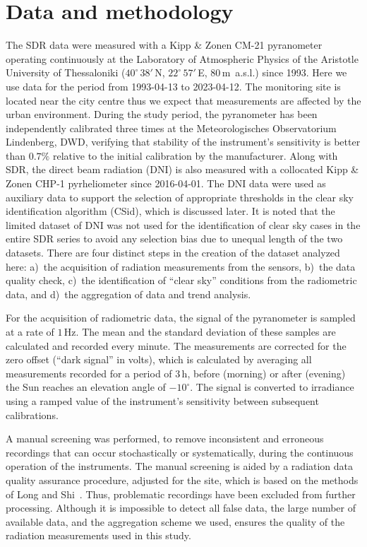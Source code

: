 \documentclass[applsci,article,submit,moreauthors,pdftex]{Definitions/mdpi}
\begin{document}
\hypertarget{data-and-methodology}{%
\section{Data and methodology}\label{data-and-methodology}}

The SDR data were measured with a Kipp \& Zonen CM-21 pyranometer
operating continuously at the Laboratory of Atmospheric Physics of the
Aristotle University of Thessaloniki (\(40^\circ\,38'\,\)N,
\(22^\circ\,57'\,\)E, \(80\,\)m~a.s.l.) since 1993. Here we use data for
the period from 1993-04-13 to 2023-04-12. The monitoring site is located
near the city centre thus we expect that measurements are affected by
the urban environment. During the study period, the pyranometer has been
independently calibrated three times at the Meteorologisches
Observatorium Lindenberg, DWD, verifying that stability of the
instrument's sensitivity is better than \(0.7\%\) relative to the
initial calibration by the manufacturer. Along with SDR, the direct beam
radiation (DNI) is also measured with a collocated Kipp \& Zonen CHP-1
pyrheliometer since 2016-04-01. The DNI data were used as auxiliary data
to support the selection of appropriate thresholds in the clear sky
identification algorithm (CSid), which is discussed later. It is noted
that the limited dataset of DNI was not used for the identification of
clear sky cases in the entire SDR series to avoid any selection bias due
to unequal length of the two datasets. There are four distinct steps in
the creation of the dataset analyzed here: a)~the acquisition of
radiation measurements from the sensors, b)~the data quality check,
c)~the identification of ``clear sky'' conditions from the radiometric
data, and d)~the aggregation of data and trend analysis.

For the acquisition of radiometric data, the signal of the pyranometer
is sampled at a rate of \(1\,\text{Hz}\). The mean and the standard
deviation of these samples are calculated and recorded every minute. The
measurements are corrected for the zero offset (``dark signal'' in
volts), which is calculated by averaging all measurements recorded for a
period of \(3\,\text{h}\), before (morning) or after (evening) the Sun
reaches an elevation angle of \(-10^\circ\). The signal is converted to
irradiance using a ramped value of the instrument's sensitivity between
subsequent calibrations.

A manual screening was performed, to remove inconsistent and erroneous
recordings that can occur stochastically or systematically, during the
continuous operation of the instruments. The manual screening is aided
by a radiation data quality assurance procedure, adjusted for the site,
which is based on the methods of Long and
Shi~\citetext{\citeyear{Long2008a}; \citeyear{Long2006}}. Thus,
problematic recordings have been excluded from further processing.
Although it is impossible to detect all false data, the large number of
available data, and the aggregation scheme we used, ensures the quality
of the radiation measurements used in this study.
\end{document}
